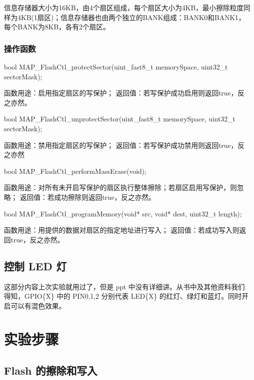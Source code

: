 \documentclass[a4paper,10pt,UTF8]{paper}
\numberwithin{equation}{section}
\numberwithin{figure}{section}
\begin{document}
信息存储器大小为16KB，由4个扇区组成，每个扇区大小为4KB，最小擦除粒度同样为4KB(1扇区)；信息存储器也由两个独立的BANK组成：BANK0和BANK1，每个BANK为8KB，各有2个扇区。

\subsubsection{操作函数}

\begin{ccode}
  bool MAP_FlashCtl_protectSector(uint_fast8_t memorySpace,
   uint32_t sectorMask);
\end{ccode}

函数用途：启用指定扇区的写保护；
返回值：若写保护成功启用则返回true，反之亦然。

\begin{ccode}
  bool MAP_FlashCtl_unprotectSector(uint_fast8_t memorySpace,
   uint32_t sectorMask);
\end{ccode}

函数用途：禁用指定扇区的写保护；
返回值：若写保护成功禁用则返回true，反之亦然

\begin{ccode}
  bool MAP_FlashCtl_performMassErase(void);
\end{ccode}

函数用途：对所有未开启写保护的扇区执行整体擦除；若扇区启用写保护，则忽略；
返回值：若成功擦除则返回true，反之亦然。

\begin{ccode}
  bool MAP_FlashCtl_programMemory(void* src, void* dest,
   uint32_t length);
\end{ccode}

函数用途：用提供的数据对扇区的指定地址进行写入；
返回值：若成功写入则返回true，反之亦然。

\subsection{控制 LED 灯}

这部分内容上次实验就用过了，但是 ppt 中没有详细讲。从书中及其他资料我们得知，GPIO\{X\} 中的 PIN0,1,2 分别代表 LED\{X\} 的红灯、绿灯和蓝灯。同时开启可以有混色效果。

\section{实验步骤}

\subsection{Flash 的擦除和写入}
\end{document}

